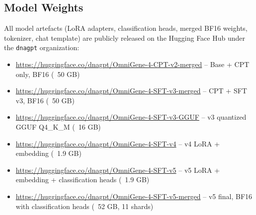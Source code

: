 \documentclass[11pt]{article}
\begin{document}
\subsection{Model Weights}

All model artefacts (LoRA adapters, classification heads, merged BF16 weights, tokenizer, chat template) are publicly released on the Hugging Face Hub under the \texttt{dnagpt} organization:

\begin{itemize}
\item \url{https://huggingface.co/dnagpt/OmniGene-4-CPT-v2-merged} -- Base + CPT only, BF16 (~50 GB)
\item \url{https://huggingface.co/dnagpt/OmniGene-4-SFT-v3-merged} -- CPT + SFT v3, BF16 (~50 GB)
\item \url{https://huggingface.co/dnagpt/OmniGene-4-SFT-v3-GGUF} -- v3 quantized GGUF Q4\_K\_M (~16 GB)
\item \url{https://huggingface.co/dnagpt/OmniGene-4-SFT-v4} -- v4 LoRA + embedding (~1.9 GB)
\item \url{https://huggingface.co/dnagpt/OmniGene-4-SFT-v5} -- v5 LoRA + embedding + classification heads (~1.9 GB)
\item \url{https://huggingface.co/dnagpt/OmniGene-4-SFT-v5-merged} -- v5 final, BF16 with classification heads (~52 GB, 11 shards)
\end{itemize}
\end{document}
